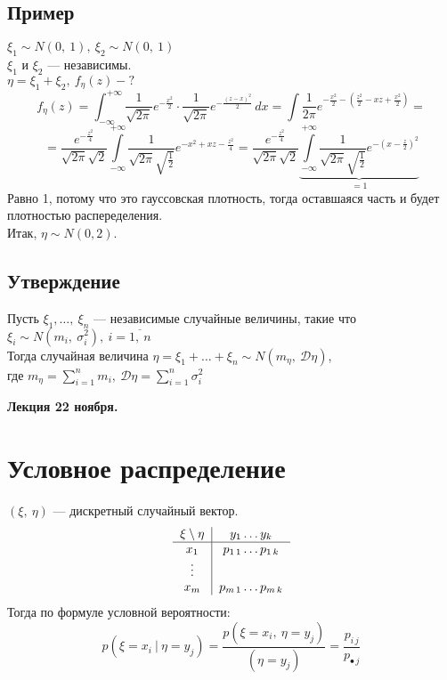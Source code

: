 \documentclass[12pt, a4paper]{article}
\begin{document}
    \subsection*{Пример}
    $\xi_1 \sim N(0,\ 1),\ \xi_2 \sim N(0,\ 1)$\\
    $\xi_1$ и $\xi_2$ --- независимы.\\
    $\eta = \xi_1 + \xi_2,\ f_{\eta}(z) - ?$
    \[f_{\eta}(z) = \int_{-\infty}^{+\infty} \frac{1}{\sqrt{2\pi}} e^{-\frac{x^2}{2}}\cdot \frac{1}{\sqrt{2\pi}} e^{-\frac{(z - x)^2}{2}}\, dx = \int\frac{1}{2\pi}e^{-\frac{x^2}{2} - \left( \frac{z^2}{2} - xz + \frac{x^2}{2} \right)}=\]
    \[=\frac{e^{-\frac{z^2}{4}}}{\sqrt{2\pi}\sqrt{2}} \int\limits_{-\infty}^{+\infty} \frac{1}{\sqrt{2\pi}\sqrt{\frac{1}{2}}} e^{-x^2 + xz - \frac{z^2}{4}} = \frac{e^{-\frac{z^2}{4}}}{\sqrt{2\pi}\sqrt{2}} \underset{=1}{\underbrace{\int\limits_{-\infty}^{+\infty} \frac{1}{\sqrt{2\pi}\sqrt{\frac{1}{2}}} e^{-(x - \frac{z}{2})^2}}}\]
    Равно 1, потому что это гауссовская плотность, тогда оставшаяся часть и будет плотностью распеределения.\\
    Итак, $\eta \sim N(0, 2)$.
    \subsection*{Утверждение}
    Пусть $\xi_1,\dots,\ \xi_n$ --- независимые случайные величины, такие что $\xi_i\sim N(m_i,\ \sigma_i^2),\ i = \overline{1,\ n}$\\
    Тогда случайная величина $\eta = \xi_1 + \dots + \xi_n \sim N(m_{\eta},\ \mathcal{D}\eta)$,\\
    где $\displaystyle m_{\eta} = \sum_{i = 1}^{n} m_i,\ \mathcal{D}\eta = \sum_{i = 1}^{n} \sigma_i^2$
    \begin{center}
        \bf Лекция 22 ноября.
    \end{center}
    \section*{Условное распределение}
    $(\xi,\ \eta)$ --- дискретный случайный вектор.
    \[\begin{tabular}{c|c}
        $\xi \setminus \eta$ & $y_1\dots y_k$\\
        \hline
        $x_1$                & $p_{1\, 1}\dots p_{1\, k}$\\
        $\vdots$             & \\
        $x_m$                & $p_{m\, 1}\dots p_{m\, k}$
    \end{tabular}\]
    Тогда по формуле условной вероятности:
    \[p(\xi = x_i\ \big|\ \eta = y_j) = \frac{p(\xi = x_i,\ \eta = y_j)}{(\eta = y_j)} = \frac{p_{i\, j}}{p_{\bullet\, j}}\]
\end{document}
